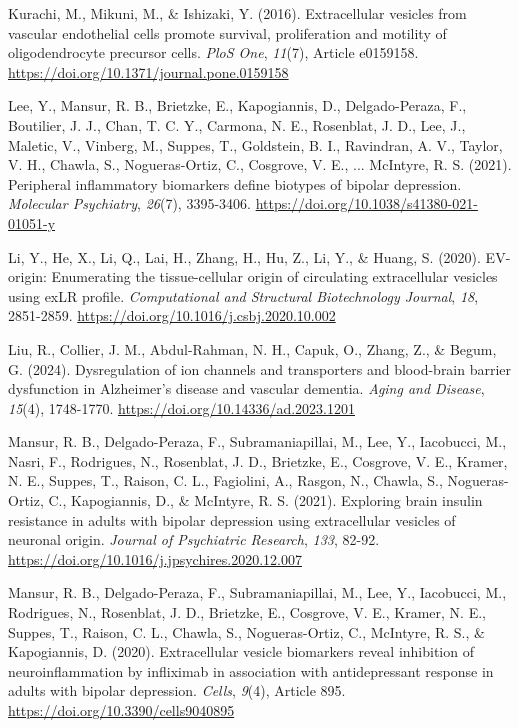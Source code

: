 \documentclass[authordate, empirical]{jote-new-article}
\begin{document}
	Kurachi, M., Mikuni, M., \& Ishizaki, Y. (2016). Extracellular vesicles from vascular endothelial cells promote survival, proliferation and motility of oligodendrocyte precursor cells. \emph{PloS One},\emph{ 11}(7), Article e0159158. \url{https://doi.org/10.1371/journal.pone.0159158}



	Lee, Y., Mansur, R. B., Brietzke, E., Kapogiannis, D., Delgado-Peraza, F., Boutilier, J. J., Chan, T. C. Y., Carmona, N. E., Rosenblat, J. D., Lee, J., Maletic, V., Vinberg, M., Suppes, T., Goldstein, B. I., Ravindran, A. V., Taylor, V. H., Chawla, S., Nogueras-Ortiz, C., Cosgrove, V. E., ... McIntyre, R. S. (2021). Peripheral inflammatory biomarkers define biotypes of bipolar depression. \emph{Molecular Psychiatry},\emph{ 26}(7), 3395-3406. \url{https://doi.org/10.1038/s41380-021-01051-y}



	Li, Y., He, X., Li, Q., Lai, H., Zhang, H., Hu, Z., Li, Y., \& Huang, S. (2020). EV-origin: Enumerating the tissue-cellular origin of circulating extracellular vesicles using exLR profile. \emph{Computational and Structural Biotechnology Journal},\emph{ 18}, 2851-2859. \url{https://doi.org/10.1016/j.csbj.2020.10.002}



	Liu, R., Collier, J. M., Abdul-Rahman, N. H., Capuk, O., Zhang, Z., \& Begum, G. (2024). Dysregulation of ion channels and transporters and blood-brain barrier dysfunction in Alzheimer's disease and vascular dementia. \emph{Aging and Disease},\emph{ 15}(4), 1748-1770. \url{https://doi.org/10.14336/ad.2023.1201}



	Mansur, R. B., Delgado-Peraza, F., Subramaniapillai, M., Lee, Y., Iacobucci, M., Nasri, F., Rodrigues, N., Rosenblat, J. D., Brietzke, E., Cosgrove, V. E., Kramer, N. E., Suppes, T., Raison, C. L., Fagiolini, A., Rasgon, N., Chawla, S., Nogueras-Ortiz, C., Kapogiannis, D., \& McIntyre, R. S. (2021). Exploring brain insulin resistance in adults with bipolar depression using extracellular vesicles of neuronal origin. \emph{Journal of Psychiatric Research},\emph{ 133}, 82-92. \url{https://doi.org/10.1016/j.jpsychires.2020.12.007}



	Mansur, R. B., Delgado-Peraza, F., Subramaniapillai, M., Lee, Y., Iacobucci, M., Rodrigues, N., Rosenblat, J. D., Brietzke, E., Cosgrove, V. E., Kramer, N. E., Suppes, T., Raison, C. L., Chawla, S., Nogueras-Ortiz, C., McIntyre, R. S., \& Kapogiannis, D. (2020). Extracellular vesicle biomarkers reveal inhibition of neuroinflammation by infliximab in association with antidepressant response in adults with bipolar depression. \emph{Cells},\emph{ 9}(4), Article 895. \url{https://doi.org/10.3390/cells9040895}
\end{document}
